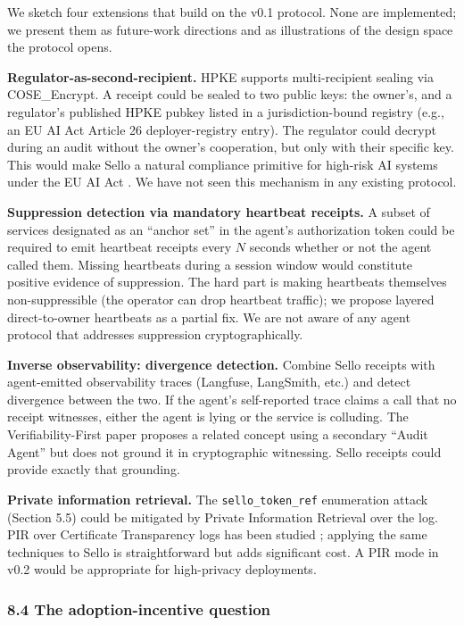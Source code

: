 \documentclass[
  11pt,
]{article}
\begin{document}
We sketch four extensions that build on the v0.1 protocol. None are
implemented; we present them as future-work directions and as
illustrations of the design space the protocol opens.

\textbf{Regulator-as-second-recipient.} HPKE supports multi-recipient
sealing via COSE\_Encrypt. A receipt could be sealed to two public keys:
the owner's, and a regulator's published HPKE pubkey listed in a
jurisdiction-bound registry (e.g., an EU AI Act Article 26
deployer-registry entry). The regulator could decrypt during an audit
without the owner's cooperation, but only with their specific key. This
would make Sello a natural compliance primitive for high-risk AI systems
under the EU AI Act \citep{euaiact}. We have not seen this mechanism in
any existing protocol.

\textbf{Suppression detection via mandatory heartbeat receipts.} A
subset of services designated as an ``anchor set'' in the agent's
authorization token could be required to emit heartbeat receipts every
\(N\) seconds whether or not the agent called them. Missing heartbeats
during a session window would constitute positive evidence of
suppression. The hard part is making heartbeats themselves
non-suppressible (the operator can drop heartbeat traffic); we propose
layered direct-to-owner heartbeats as a partial fix. We are not aware of
any agent protocol that addresses suppression cryptographically.

\textbf{Inverse observability: divergence detection.} Combine Sello
receipts with agent-emitted observability traces (Langfuse, LangSmith,
etc.) and detect divergence between the two. If the agent's
self-reported trace claims a call that no receipt witnesses, either the
agent is lying or the service is colluding. The Verifiability-First
paper \citep{gupta-verifiabilityfirst} proposes a related concept using
a secondary ``Audit Agent'' but does not ground it in cryptographic
witnessing. Sello receipts could provide exactly that grounding.

\textbf{Private information retrieval.} The \texttt{sello\_token\_ref}
enumeration attack (Section 5.5) could be mitigated by Private
Information Retrieval over the log. PIR over Certificate Transparency
logs has been studied \citep{kales-pir-ct}; applying the same techniques
to Sello is straightforward but adds significant cost. A PIR mode in
v0.2 would be appropriate for high-privacy deployments.

\hypertarget{the-adoption-incentive-question}{%
\subsubsection{8.4 The adoption-incentive
question}\label{the-adoption-incentive-question}}
\end{document}
